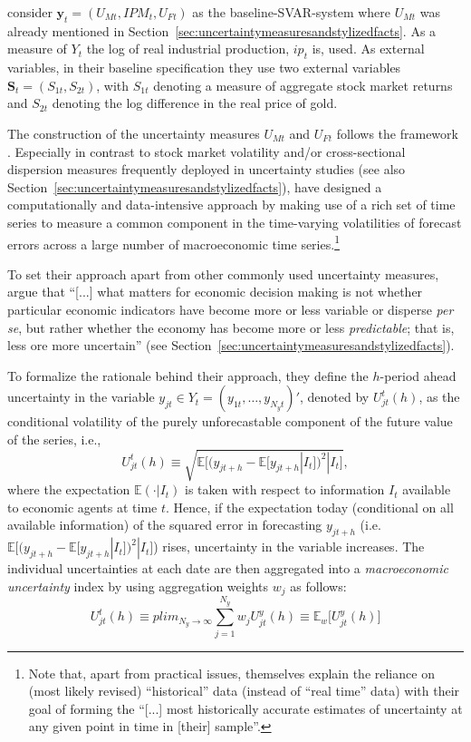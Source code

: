\documentclass[a4paper,11pt,listof=nochaptergap,oneside,pointednumbers,bibtotoc,bigheadings,liststotoc,hidelinks]{scrbook}
\theoremstyle{mysatz}
\theoremstyle{mydefinition}
\theoremstyle{mytheorem}
\theoremstyle{mybemerkung}
\newcommand{\vect}[1]{\boldsymbol{\mathbf{#1}}}
\begin{document}
\citet{ludvigsonetal:18, ludvigsonetal:19} consider $\vect{y}_t = (U_{Mt}, IPM_{t}, U_{Ft})$ as the baseline-SVAR-system where $U_{Mt}$ was already mentioned in Section~\ref{sec:uncertaintymeasuresandstylizedfacts}. As a measure of $Y_t$ the log of real industrial production, $ip_t$ is, used. As external variables, in their baseline specification they use two external variables $\vect{S}_t =  (S_{1t}, S_{2t})$, with $S_{1t}$ denoting a measure of aggregate stock market returns and $S_{2t}$ denoting the log difference in the real price of gold.

The construction of the uncertainty measures $U_{Mt}$ and $U_{Ft}$ follows the framework \citet{juradoetal:15}. Especially in contrast to stock market volatility and/or cross-sectional dispersion measures frequently deployed in uncertainty studies (see also Section~\ref{sec:uncertaintymeasuresandstylizedfacts}), \citet{juradoetal:15} have designed a computationally and data-intensive approach by making use of a rich set of time series to measure a common component in the time-varying volatilities of forecast errors across a large number of macroeconomic time series.\footnote{Note that, apart from practical issues, \citet[p. 1191]{juradoetal:15} themselves explain the reliance on (most likely revised) ``historical'' data (instead of ``real time'' data) with their goal of forming the ``[...] most historically accurate estimates of uncertainty at any given point in time in [their] sample''.}

To set their approach apart from other commonly used uncertainty measures, \citet[p. 1178]{juradoetal:15} argue that ``[...] what matters for economic decision making is not whether particular economic indicators have become more or less variable or disperse \textit{per se}, but rather whether the economy has become more or less \textit{predictable}; that is, less ore more uncertain'' (see Section~\ref{sec:uncertaintymeasuresandstylizedfacts}).

To formalize the rationale behind their approach, they define the $h$-period ahead uncertainty in the variable $y_{jt} \in Y_t = (y_{1t}, \ldots, y_{N_{y}t})'$, denoted by $U^t_{jt}(h)$, as the conditional volatility of the purely unforecastable component of the future value of the series, i.e.,
\begin{equation} \label{eq:juradoetal_1}
U^t_{jt}(h) \equiv \sqrt{\mathbb{E}\Big[(y_{jt+h} - \mathbb{E}[y_{jt+h}|I_t])^2|I_t\Big]},
\end{equation}
where the expectation $\mathbb{E}(\cdot|I_t)$ is taken with respect to information $I_t$ available to economic agents at time $t$. Hence, if the expectation today (conditional on all available information) of the squared error in forecasting $y_{jt+h}$ (i.e. $\mathbb{E}\Big[(y_{jt+h} - \mathbb{E}[y_{jt+h}|I_t])^2|I_t\Big]$) rises, uncertainty in the variable increases. The individual uncertainties at each date are then aggregated into a \textit{macroeconomic uncertainty} index by using aggregation weights $w_j$ as follows:
\begin{equation} \label{eq:juradoetal_2}
U^t_{jt}(h) \equiv plim_{N_{y}\to\infty} \sum_{j=1}^{N_y} w_j U_{jt}^y(h) \equiv \mathbb{E}_w \Big[U_{jt}^y(h)\Big]
\end{equation}
\end{document}
